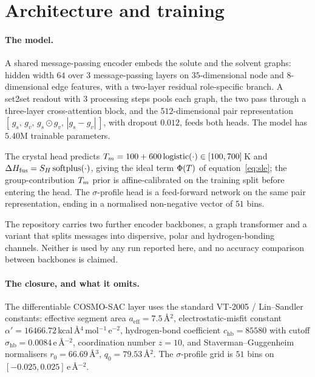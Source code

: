 
\section{Architecture and training}
\label{si:arch}

\paragraph{The model.}
A shared message-passing encoder embeds the solute and the solvent graphs: hidden width $64$ over
$3$ message-passing layers on $35$-dimensional node and $8$-dimensional edge features, with a
two-layer residual role-specific branch. A set2set readout with $3$ processing steps pools each
graph, the two pass through a three-layer cross-attention block, and the $512$-dimensional pair
representation $[\,g_s,\,g_v,\,g_s\!\odot g_v,\,|g_s-g_v|\,]$, with dropout $0.012$, feeds both
heads. The model has $5.40$M trainable parameters.

The crystal head predicts $T_m=100+600\,\mathrm{logistic}(\cdot)\in[100,700]$\,K and
$\Delta H_{\mathrm{fus}}=S_H\,\mathrm{softplus}(\cdot)$, giving the ideal term $\Phi(T)$ of
equation~\eqref{eq:sle}; the group-contribution $T_m$ prior is affine-calibrated on the training
split before entering the head. The $\sigma$-profile head is a feed-forward network on the same
pair representation, ending in a normalised non-negative vector of $51$ bins.

The repository carries two further encoder backbones, a graph transformer and a variant that splits
messages into dispersive, polar and hydrogen-bonding channels. Neither is used by any run reported
here, and no accuracy comparison between backbones is claimed.

\paragraph{The closure, and what it omits.}
The differentiable COSMO-SAC layer uses the standard VT-2005 / Lin--Sandler constants: effective
segment area $a_{\mathrm{eff}}=7.5$\,\AA$^2$, electrostatic-misfit constant
$\alpha'=16466.72$\,kcal\,\AA$^4$\,mol$^{-1}$\,e$^{-2}$, hydrogen-bond coefficient
$c_{\mathrm{hb}}=85580$ with cutoff $\sigma_{\mathrm{hb}}=0.0084$\,e\,\AA$^{-2}$, coordination
number $z=10$, and Staverman--Guggenheim normalisers $r_0=66.69$\,\AA$^3$, $q_0=79.53$\,\AA$^2$. The
$\sigma$-profile grid is $51$ bins on $[-0.025,0.025]$\,e\,\AA$^{-2}$.

